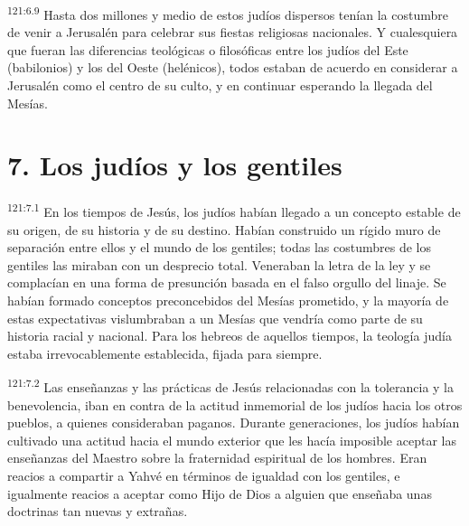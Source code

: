 \par 
\textsuperscript{121:6.9} Hasta dos millones y medio de estos judíos dispersos tenían la costumbre de venir a Jerusalén para celebrar sus fiestas religiosas nacionales. Y cualesquiera que fueran las diferencias teológicas o filosóficas entre los judíos del Este (babilonios) y los del Oeste (helénicos), todos estaban de acuerdo en considerar a Jerusalén como el centro de su culto, y en continuar esperando la llegada del Mesías.

\section*{7. Los judíos y los gentiles}
\par 
\textsuperscript{121:7.1} En los tiempos de Jesús, los judíos habían llegado a un concepto estable de su origen, de su historia y de su destino. Habían construido un rígido muro de separación entre ellos y el mundo de los gentiles; todas las costumbres de los gentiles las miraban con un desprecio total. Veneraban la letra de la ley y se complacían en una forma de presunción basada en el falso orgullo del linaje. Se habían formado conceptos preconcebidos del Mesías prometido, y la mayoría de estas expectativas vislumbraban a un Mesías que vendría como parte de su historia racial y nacional. Para los hebreos de aquellos tiempos, la teología judía estaba irrevocablemente establecida, fijada para siempre.

\par 
\textsuperscript{121:7.2} Las enseñanzas y las prácticas de Jesús relacionadas con la tolerancia y la benevolencia, iban en contra de la actitud inmemorial de los judíos hacia los otros pueblos, a quienes consideraban paganos. Durante generaciones, los judíos habían cultivado una actitud hacia el mundo exterior que les hacía imposible aceptar las enseñanzas del Maestro sobre la fraternidad espiritual de los hombres. Eran reacios a compartir a Yahvé en términos de igualdad con los gentiles, e igualmente reacios a aceptar como Hijo de Dios a alguien que enseñaba unas doctrinas tan nuevas y extrañas.

